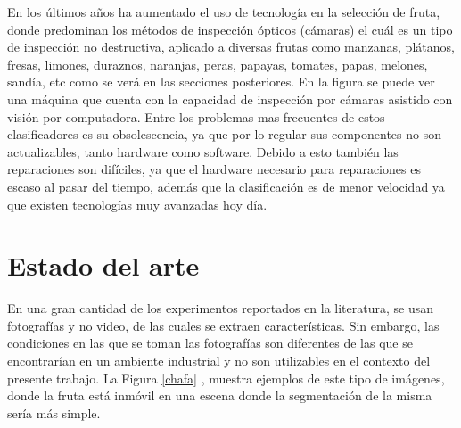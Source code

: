 \documentclass[twoside,spanish,ESP,MSc]{plantillaLabUPV}
\theoremstyle{definition}
\begin{document}

 En los últimos años ha aumentado el uso de tecnología en la selección de fruta, donde predominan los métodos de inspección ópticos (cámaras) el cuál es un tipo de inspección no destructiva, aplicado a diversas frutas como manzanas, plátanos, fresas, limones, duraznos, naranjas, peras, papayas, tomates, papas, melones, sandía, etc como se verá en las secciones posteriores. En la figura %
se puede ver una máquina que cuenta con la capacidad de inspección por cámaras asistido con visión por computadora. Entre los problemas mas frecuentes de estos clasificadores es su obsolescencia, ya que por lo regular sus componentes no son actualizables, tanto hardware como software. Debido a esto también las reparaciones son difíciles, ya que el hardware necesario para reparaciones es escaso al pasar del tiempo, además que la clasificación es de menor velocidad ya que existen tecnologías muy avanzadas hoy día.





\section{Estado del arte}

En una gran cantidad de los experimentos reportados en la literatura, se usan fotografías y no video, de las cuales se extraen características. Sin embargo, las condiciones en las que se toman las fotografías son diferentes de las que se encontrarían en un ambiente industrial y no son utilizables en el contexto del presente trabajo. La  Figura \ref{chafa} \cite{chafafrut}, muestra ejemplos de este tipo de imágenes, donde la fruta está inmóvil en una escena donde la segmentación de la misma sería más simple.
\end{document}
